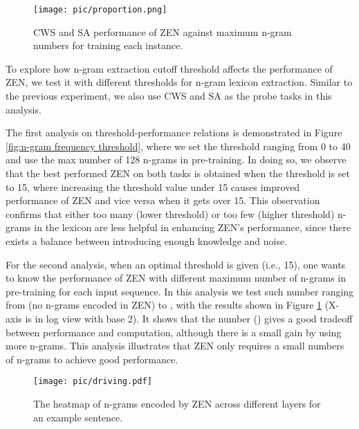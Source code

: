 \documentclass[11pt,a4paper]{article}
\begin{document}
\begin{CJK}{UTF8}{gbsn}
\begin{figure}[t]
	\begin{center}
		\texttt{[image: pic/proportion.png]}
        \caption{CWS and SA performance of ZEN against maximum n-gram numbers for training each instance.}
        \label{fig:n-gram proportion}
	\end{center}
	\vspace{-1.0em}
\end{figure}

To explore how n-gram extraction cutoff threshold affects the performance of ZEN,
we test it with different thresholds for n-gram lexicon extraction.
Similar to the previous experiment, we also use CWS and SA as the probe tasks in this analysis.


The first analysis on threshold-performance relations is demonstrated in Figure \ref{fig:n-gram frequency threshold}, where we set the threshold ranging from 0 to 40 and use the max number of 128 n-grams in pre-training.
In doing so, we observe that 
the best performed ZEN on both tasks is obtained when the threshold is set to 15, where increasing the threshold value under 15 causes improved performance of ZEN and vice versa when it gets over 15.
This observation confirms that either too many (lower threshold) or too few (higher threshold) n-grams in the lexicon are less helpful in enhancing ZEN's performance, since there exists a balance between introducing enough knowledge and noise.


For the second analysis,
when an optimal threshold is given (i.e., 15), one wants to know the performance of ZEN with different maximum number of n-grams in pre-training for each input sequence.
In this analysis we test such number ranging from  (no n-grams encoded in ZEN) to , with
the results shown in Figure \ref{fig:n-gram proportion} (X-axis is in log view with base 2).
It shows that the number  () gives a good tradeoff between performance and computation, although there is a small gain by using more n-grams.
This analysis illustrates that ZEN only requires a small numbers of n-grams to achieve good performance.




\begin{figure}[t]
	\begin{center}
		\texttt{[image: pic/driving.pdf]}
        \caption{The heatmap of n-grams encoded by ZEN across different layers for an example sentence.}
        \label{fig:visualization-1}
	\end{center}
	\vspace{-1.0em}
\end{figure}



\end{CJK}
\end{document}
